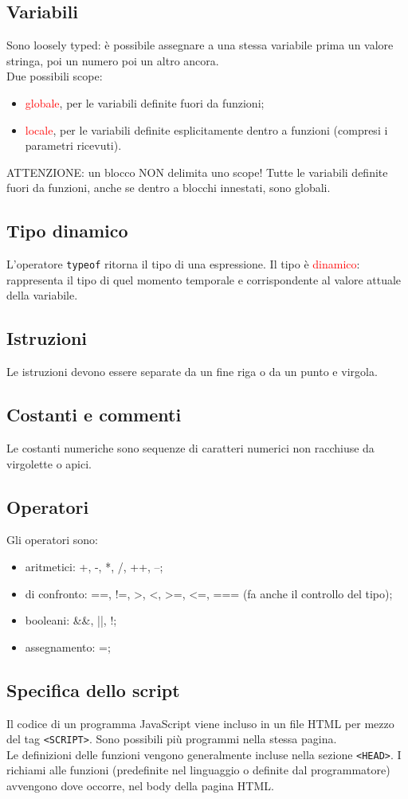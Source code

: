 \documentclass{article}
\begin{document}
\subsection{Variabili}
Sono loosely typed: è possibile assegnare a una stessa variabile prima un valore stringa, poi un numero poi un altro ancora.
\\ Due possibili scope:
\begin{itemize}
    \item \textcolor{red}{globale}, per le variabili definite fuori da funzioni;
    \item \textcolor{red}{locale}, per le variabili definite esplicitamente dentro a funzioni (compresi i parametri ricevuti).
\end{itemize}
ATTENZIONE: un blocco NON delimita uno scope! Tutte le variabili definite fuori da funzioni, anche se dentro a blocchi innestati, sono globali.
\subsection{Tipo dinamico}
L'operatore \texttt{typeof} ritorna il tipo di una espressione. Il tipo è \textcolor{red}{dinamico}: rappresenta il tipo di quel momento temporale e corrispondente al valore attuale della variabile.
\subsection{Istruzioni}
Le istruzioni devono essere separate da un fine riga o da un punto e virgola.
\subsection{Costanti e commenti}
Le costanti numeriche sono sequenze di caratteri numerici non racchiuse da virgolette o apici.
\subsection{Operatori}
Gli operatori sono:
\begin{itemize}
    \item aritmetici: +, -, *, /, ++, --;
    \item di confronto: ==, !=, >, <, >=, <=, === (fa anche il controllo del tipo);
    \item booleani: \&\&, ||, !;
    \item assegnamento: =;
\end{itemize}
\subsection{Specifica dello script}
Il codice di un programma JavaScript viene incluso in un file HTML per mezzo del tag \texttt{<SCRIPT>}. Sono possibili più programmi nella stessa pagina.
\\ Le definizioni delle funzioni vengono generalmente incluse nella sezione \texttt{<HEAD>}. I richiami alle funzioni (predefinite nel linguaggio o definite dal programmatore) avvengono dove occorre, nel body della pagina HTML.
\end{document}
